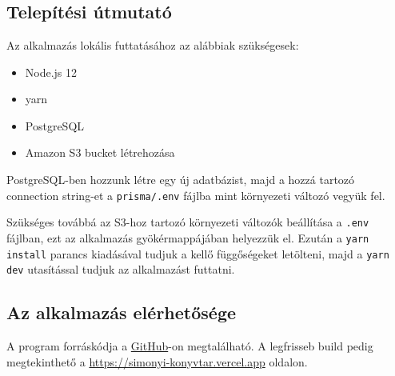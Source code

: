 \appendix
\chapter*{\fuggelek}
\setcounter{chapter}{\appendixnumber}

\section{Telepítési útmutató}

Az alkalmazás lokális futtatásához az alábbiak szükségesek:
\begin{itemize}
  \item Node.js 12
  \item yarn
  \item PostgreSQL
  \item Amazon S3 bucket létrehozása
\end{itemize}

PostgreSQL-ben hozzunk létre egy új adatbázist, majd a hozzá tartozó connection string-et a \lstinline|prisma/.env| fájlba mint
környezeti változó vegyük fel.

Szükséges továbbá az S3-hoz tartozó környezeti változók beállítása a \lstinline|.env| fájlban, ezt az alkalmazás gyökérmappájában helyezzük el.
Ezután a \lstinline|yarn install| parancs kiadásával tudjuk a kellő függőségeket letölteni, majd a \lstinline|yarn dev| utasítással
tudjuk az alkalmazást futtatni.

\section{Az alkalmazás elérhetősége}

A program forráskódja a \href{https://OmTheTurtle/simonyi-konyvtar}{GitHub}-on megtalálható.
A legfrisseb build pedig megtekinthető a \href{https://simonyi-konyvtar.vercel.app}{https://simonyi-konyvtar.vercel.app} oldalon.

